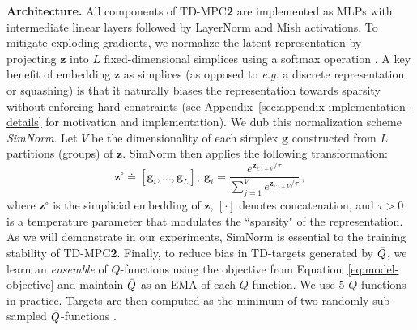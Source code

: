\documentclass{article}
\begin{document}
\textbf{Architecture.} All components of TD-MPC\textbf{2} are implemented as MLPs with intermediate linear layers followed by LayerNorm \citep{Ba2016LayerN} and Mish \citep{Misra2019MishAS} activations. To mitigate exploding gradients, we normalize the latent representation by projecting $\mathbf{z}$ into $L$ fixed-dimensional simplices using a softmax operation \citep{Lavoie2022SimplicialEI}. A key benefit of embedding $\mathbf{z}$ as simplices (as opposed to \emph{e.g.} a discrete representation or squashing) is that it naturally biases the representation towards sparsity without enforcing hard constraints (see Appendix~\ref{sec:appendix-implementation-details} for motivation and implementation). We dub this normalization scheme \emph{SimNorm}. Let $V$ be the dimensionality of each simplex $\mathbf{g}$ constructed from $L$ partitions (groups) of $\mathbf{z}$. SimNorm then applies the following transformation:
\begin{equation}
    \label{eq:simnorm}
    \mathbf{z}^{\circ} \doteq \left[ \mathbf{g}_{i}, \dots, \mathbf{g}_{L} \right],~ \mathbf{g}_{i} = \frac{e^{\mathbf{z}_{i:i+V}/\tau}}{\sum_{j=1}^{V} e^{\mathbf{z}_{i:i+V}/\tau}}\,,
\end{equation}
where $\mathbf{z}^{\circ}$ is the simplicial embedding of $\mathbf{z}$, $\left[ \cdot \right]$ denotes concatenation, and $\tau > 0$ is a temperature parameter that modulates the ``sparsity" of the representation. As we will demonstrate in our experiments, SimNorm is essential to the training stability of TD-MPC\textbf{2}. Finally, to reduce bias in TD-targets generated by $\Bar{Q}$, we learn an \emph{ensemble} of $Q$-functions using the objective from Equation~\ref{eq:model-objective} and maintain $\Bar{Q}$ as an EMA of each $Q$-function. We use $5$ $Q$-functions in practice. Targets are then computed as the minimum of two randomly sub-sampled $\Bar{Q}$-functions \citep{chen2021randomized}.
\end{document}
